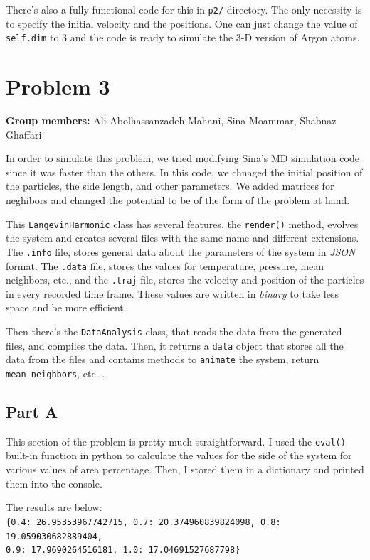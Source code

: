 \documentclass[12pt, a4paper]{article}
\begin{document}
	There's also a fully functional code for this in \texttt{p2/} directory. The only necessity is to specify the initial velocity and the positions. One can 
	just change the value of \texttt{self.dim} to $3$ and the code is ready to simulate the 3-D version of Argon atoms.

	\section{Problem 3}
	\textbf{Group members:} Ali Abolhassanzadeh Mahani, Sina Moammar, Shabnaz Ghaffari
	
	In order to simulate this problem, we tried modifying Sina's MD simulation code since it was faster than the others. In this code, we chnaged the 
	initial position of the particles, the side length, and other parameters. We added matrices for neghibors and changed the potential to be of 
	the form of the problem at hand. 
	
	This \texttt{LangevinHarmonic} class has several features. the \texttt{render()} method, evolves the system and creates several files with the
	same name and different extensions. The \texttt{.info} file, stores general data about the parameters of the system in \emph{JSON} format.
	The \texttt{.data} file, stores the values for temperature, pressure, mean neighbors, etc., and the \texttt{.traj} file, stores the velocity and
	position of the particles in every recorded time frame. These values are written in \emph{binary} to take less space and be more efficient.
	
	Then there's the \texttt{DataAnalysis} class, that reads the data from the generated files, and compiles the data. Then, it returns a \texttt{data}
	object that stores all the data from the files and contains methods to \texttt{animate} the system, return \texttt{mean\_neighbors}, etc. .
	
	\subsection{Part A}
	This section of the problem is pretty much straightforward. I used the \texttt{eval()} built-in function in python to calculate the values for 
	the side of the system for various values of area percentage. Then, I stored them in a dictionary and printed them into the console.
		
	The results are below:\\
	\texttt{\{0.4: 26.95353967742715, 0.7: 20.374960839824098, 0.8: 19.059030682889404, \\0.9: 17.9690264516181, 1.0: 17.04691527687798\}}
\end{document}
